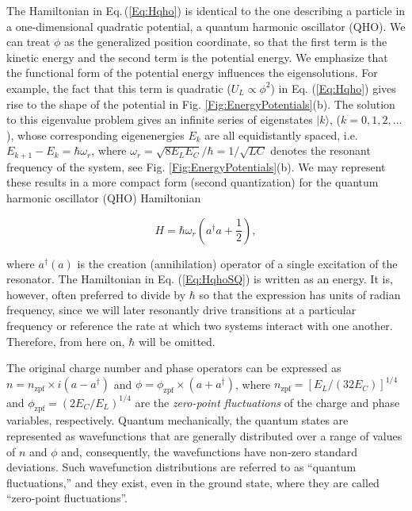 \documentclass[aip,apr,twocolumn,showpacs,superscriptaddress,groupedaddress,nofootinbib,reprint]{revtex4-1}  %
\begin{document}
The Hamiltonian in Eq.$\,$(\ref{Eq:Hqho}) is identical to the one describing a particle in a one-dimensional quadratic potential, a quantum harmonic oscillator (QHO). We can treat $\phi$ as the generalized position coordinate, so that the first term is the kinetic energy and the second term is the potential energy. We emphasize that the functional form of the potential energy influences the eigensolutions. For example, the fact that this term is quadratic ($U_L \propto \phi^2$) in Eq. (\ref{Eq:Hqho}) gives rise to the shape of the potential in Fig. \ref{Fig:EnergyPotentials}(b). The solution to this eigenvalue problem gives an infinite series of eigenstates $|k\rangle$, ($k = 0,1,2,\ldots$), whose corresponding eigenenergies $E_k$ are all equidistantly spaced, i.e. $E_{k+1} - E_k = \hbar \omega_r$, where $\omega_r = \sqrt{8 E_L E_C}/\hbar = 1/\sqrt{L C}$ denotes the resonant frequency of the system, see Fig. \ref{Fig:EnergyPotentials}(b). We may represent these results in a more compact form (second quantization) for the quantum harmonic oscillator (QHO) Hamiltonian

\begin{equation}
H = \hbar\omega_{r}\left( a^{\dagger}a + \frac{1}{2}\right),
\label{Eq:HqhoSQ}
\end{equation}

\noindent where $a^{\dagger}(a)$ is the creation (annihilation) operator of a single excitation of the resonator. The Hamiltonian in Eq. (\ref{Eq:HqhoSQ}) is written as an energy. It is, however, often preferred to divide by $\hbar$ so that the expression has units of radian frequency, since we will later resonantly drive transitions at a particular frequency or reference the rate at which two systems interact with one another. Therefore, from here on, $\hbar$ will be omitted.

The original charge number and phase operators can be expressed as $n = n_{\text{zpf}}\times i(a - a^{\dagger})$ and $\phi = \phi_{\text{zpf}} \times (a + a^{\dagger})$, where $n_{\text{zpf}} = [E_L/(32E_C)]^{1/4}$ and $\phi_{\text{zpf}} = (2E_C/E_L)^{1/4}$ are the \textit{zero-point fluctuations} of the charge and phase variables, respectively. Quantum mechanically, the quantum states are represented as wavefunctions that are generally distributed over a range of values of $n$ and $\phi$ and, consequently, the wavefunctions have non-zero standard deviations. Such wavefunction distributions are referred to as ``quantum fluctuations,'' and they exist, even in the ground state, where they are called ``zero-point fluctuations''.
\end{document}
